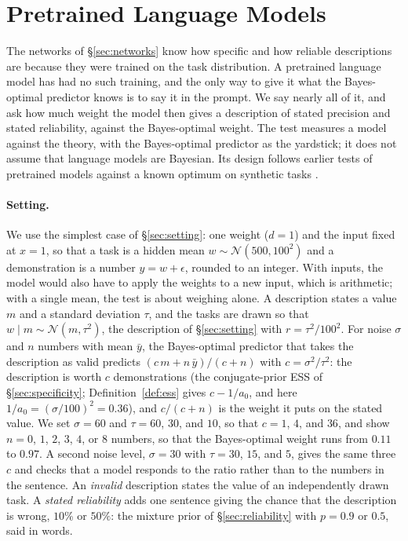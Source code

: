 \documentclass[10pt,twocolumn]{article}
\begin{document}
\section{Pretrained Language Models}\label{sec:llm}
The networks of \S\ref{sec:networks} know how specific and how reliable descriptions are because they were trained on the task distribution. A pretrained language model has had no such training, and the only way to give it what the Bayes-optimal predictor knows is to say it in the prompt. We say nearly all of it, and ask how much weight the model then gives a description of stated precision and stated reliability, against the Bayes-optimal weight. The test measures a model against the theory, with the Bayes-optimal predictor as the yardstick; it does not assume that language models are Bayesian. Its design follows earlier tests of pretrained models against a known optimum on synthetic tasks \citep{gupta2025, akata2026}.

\paragraph{Setting.} We use the simplest case of \S\ref{sec:setting}: one weight ($d = 1$) and the input fixed at $x = 1$, so that a task is a hidden mean $w \sim \mathcal{N}(500, 100^2)$ and a demonstration is a number $y = w + \epsilon$, rounded to an integer. With inputs, the model would also have to apply the weights to a new input, which is arithmetic; with a single mean, the test is about weighing alone. A description states a value $m$ and a standard deviation $\tau$, and the tasks are drawn so that $w \mid m \sim \mathcal{N}(m, \tau^2)$, the description of \S\ref{sec:setting} with $r = \tau^2 / 100^2$. For noise $\sigma$ and $n$ numbers with mean $\bar y$, the Bayes-optimal predictor that takes the description as valid predicts $(c\,m + n\,\bar y)/(c + n)$ with $c = \sigma^2 / \tau^2$: the description is worth $c$ demonstrations (the conjugate-prior ESS of \S\ref{sec:specificity}; Definition~\ref{def:ess} gives $c - 1/a_0$, and here $1/a_0 = (\sigma/100)^2 = 0.36$), and $c/(c+n)$ is the weight it puts on the stated value. We set $\sigma = 60$ and $\tau = 60$, $30$, and $10$, so that $c = 1$, $4$, and $36$, and show $n = 0$, $1$, $2$, $3$, $4$, or $8$ numbers, so that the Bayes-optimal weight runs from $0.11$ to $0.97$. A second noise level, $\sigma = 30$ with $\tau = 30$, $15$, and $5$, gives the same three $c$ and checks that a model responds to the ratio rather than to the numbers in the sentence. An \emph{invalid} description states the value of an independently drawn task. A \emph{stated reliability} adds one sentence giving the chance that the description is wrong, $10\%$ or $50\%$: the mixture prior of \S\ref{sec:reliability} with $p = 0.9$ or $0.5$, said in words.
\end{document}
